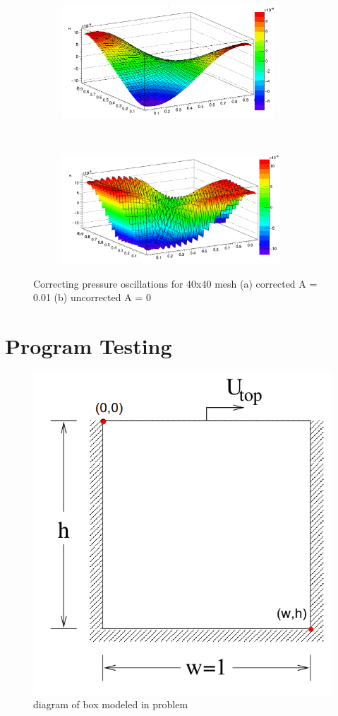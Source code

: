 \documentclass[paper=a4, fontsize=11pt, abstract=on]{scrartcl}
\numberwithin{equation}{section}		%
\numberwithin{figure}{section}			%
\numberwithin{table}{section}				%
\begin{document}
\begin{figure}[H]
        \centering
        \begin{subfigure}[h]{0.5\textwidth}
                \includegraphics[width = 8.0cm]{o1}
                \caption{}
				
        \end{subfigure}%
       ~~~~~
        \begin{subfigure}[h]{0.5\textwidth}
                \includegraphics[width = 8.2cm]{o2}
                \caption{}
                
        \end{subfigure}
        \caption{Correcting pressure oscillations for 40x40 mesh (a) corrected A = 0.01 (b) uncorrected A = 0  }
        \label{osc2}
\end{figure}

\section{Program Testing}

\begin{figure}[H]
\centering
\includegraphics[width=0.55\linewidth]{box}
\caption{diagram of box modeled in problem}
\label{prob}
\end{figure}
\end{document}
